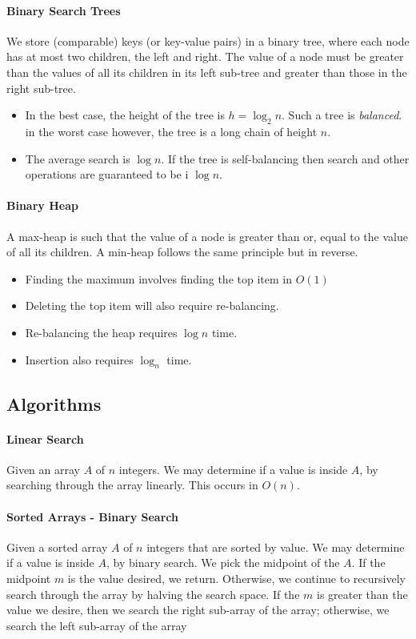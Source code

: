 \paragraph{Binary Search Trees}
We store (comparable) keys (or key-value pairs) in a binary tree, where
each node has at most two children, the left and right. The value of a node
must be greater than the values of all its children in its left sub-tree
and greater than those in the right sub-tree.
\begin{itemize}
    \item In the best case, the height of the tree is \(h = \log_2 n\).
    Such a tree is \textit{balanced}. in the worst case however, the tree
    is a long chain of height \(n\).
    \item The average search is \(\log n\). If the tree is self-balancing
    then search and other operations are guaranteed to be i \(\log n\).
\end{itemize}

\paragraph{Binary Heap}
A max-heap is such that the value of a node is greater than or, equal to
the value of all its children. A min-heap follows the same principle but in
reverse.

\begin{itemize}
    \item Finding the maximum involves finding the top item in \(O(1)\)
    \item Deleting the top item will also require re-balancing.
    \item Re-balancing the heap requires \(\log n\) time.
    \item Insertion also requires \(\log_n\) time.
\end{itemize}

\subsection{Algorithms}

\paragraph{Linear Search}
Given an array \(A\) of \(n\) integers. We may determine if a value is inside
\(A\), by searching through the array linearly. This occurs in \(O(n)\).


\paragraph{Sorted Arrays - Binary Search}
Given a sorted array \(A\) of \(n\) integers that are sorted by value. We
may determine if a value is inside \(A\), by binary search. We pick the
midpoint of the \(A\). If the midpoint \(m\) is the value desired, we
return. Otherwise, we continue to recursively search through the array by
halving the search space. If the \(m\) is greater than the value we desire,
then we search the right sub-array of the array; otherwise, we search the
left sub-array of the array


